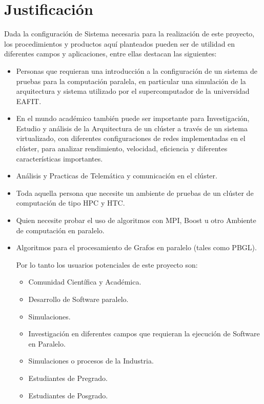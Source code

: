 \section{Justificación}



Dada la configuración de Sistema necesaria para la realización de este proyecto, los procedimientos y productos aquí planteados pueden ser de utilidad en diferentes campos y aplicaciones, entre ellas destacan las siguientes:  

\begin{itemize}
	
\item Personas que requieran una introducción a la configuración de un sistema de pruebas para la computación paralela, en particular una simulación de la arquitectura y sistema utilizado por el supercomputador de la universidad EAFIT.


\item En el mundo académico también puede ser importante para Investigación, Estudio y análisis de la Arquitectura de un clúster a través de un sistema virtualizado, con diferentes configuraciones de redes implementadas en el clúster, para analizar rendimiento, velocidad, eficiencia y diferentes características importantes. 


\item Análisis y Practicas de Telemática y comunicación en el clúster. 

\item Toda aquella persona que necesite un ambiente de pruebas de un clúster de computación  de tipo HPC y HTC.

\item Quien necesite probar el uso de algoritmos con MPI, Boost u otro Ambiente de computación en paralelo.

\item Algoritmos para el procesamiento de Grafos en paralelo (tales como PBGL).

Por lo tanto los usuarios potenciales de este proyecto son: 

\begin{itemize}
	\item Comunidad Científica y Académica.
	\item Desarrollo de Software paralelo. 
	\item Simulaciones.
	\item Investigación en diferentes campos que requieran la ejecución de Software en Paralelo. 
	\item Simulaciones o procesos de la Industria.
	\item Estudiantes de Pregrado.
	\item Estudiantes de Posgrado.
\end{itemize}


\end{itemize}
